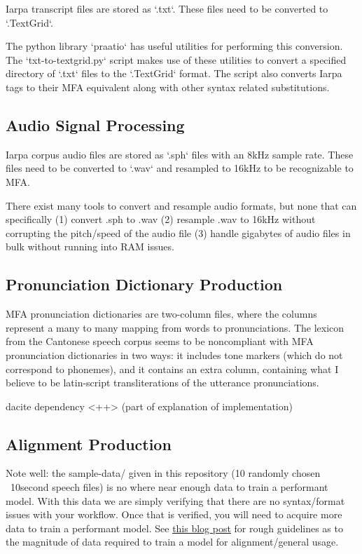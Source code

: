 \documentclass[11pt]{article}
\begin{document}
Iarpa transcript files are stored as `.txt`. These files need to be converted to `.TextGrid`.

The python library `praatio` has useful utilities for performing this conversion. The `txt-to-textgrid.py` script makes use of these utilities to convert a specified directory of `.txt` files to the `.TextGrid` format. The script also converts Iarpa tags to their MFA equivalent along with other syntax related substitutions.


\subsection{Audio Signal Processing}

Iarpa corpus audio files are stored as `.sph` files with an 8kHz sample rate. These files need to be converted to `.wav` and resampled to 16kHz to be recognizable to MFA.

There exist many tools to convert and resample audio formats, but none that can specifically (1) convert .sph to .wav (2) resample .wav to 16kHz without corrupting the pitch/speed of the audio file (3) handle gigabytes of audio files in bulk without running into RAM issues.

\subsection{Pronunciation Dictionary Production}

MFA pronunciation dictionaries are two-column files, where the columns represent a many to many mapping from words to pronunciations. The lexicon from the Cantonese speech corpus seems to be noncompliant with MFA pronunciation dictionaries in two ways: it includes tone markers (which do not correspond to phonemes), and it contains an extra column, containing what I believe to be latin-script transliterations of the utterance pronunciations.

dacite dependency <++> (part of explanation of implementation)

\subsection{Alignment Production}

Note well: the sample-data/ given in this repository (10 randomly chosen ~10second speech files) is no where near enough data to train a performant model. With this data we are simply verifying that there are no syntax/format issues with your workflow. Once that is verified, you will need to acquire more data to train a performant model. See \href{https://memcauliffe.com/how-much-data-do-you-need-for-a-good-mfa-alignment.html}{this blog post} for rough guidelines as to the magnitude of data required to train a model for alignment/general usage.
\end{document}
